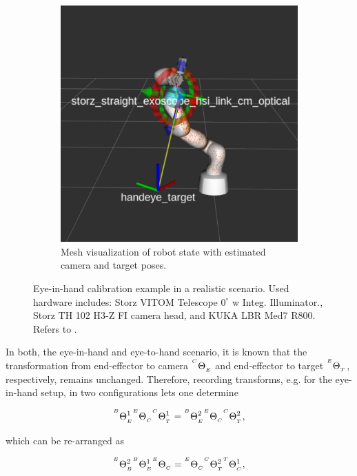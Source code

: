 \begin{figure}[htb]
\begin{subfigure}[b]{0.49\textwidth}
        \includegraphics[width=\textwidth]{introduction/img/aruco_world.png}
        \caption{Mesh visualization of robot state with estimated camera and target poses.}
    \end{subfigure}
    \caption{Eye-in-hand calibration example in a realistic scenario. Used hardware includes: Storz VITOM Telescope $0^\circ$ w Integ. Illuminator., Storz TH 102 H3-Z FI camera head, and KUKA LBR Med7 R800. Refers to .}
    \label{in:fig:eye_in_hand_setup}
\end{figure}
In both, the eye-in-hand and eye-to-hand scenario, it is known that the transformation from end-effector to camera ${}^{^C}\Theta_{_E}$ and end-effector to target ${}^{^E}\Theta_{_T}$, respectively, remains unchanged. Therefore, recording transforms, e.g. for the eye-in-hand setup, in two configurations lets one determine

\begin{equation}
    {}^{^B}\Theta_{_E}^{1}{}^{^E}\Theta_{_C}{}^{^C}\Theta_{_T}^{1} = {}^{^B}\Theta_{_E}^{2}{}^{^E}\Theta_{_C}{}^{^C}\Theta_{_T}^{2},
\end{equation}

which can be re-arranged as

\begin{equation}
    {}^{^E}\Theta_{_B}^{2}{}^{^B}\Theta_{_E}^{1}{}^{^E}\Theta_{_C} = {}^{^E}\Theta_{_C}{}^{^C}\Theta_{_T}^{2}{}^{^T}\Theta_{_C}^{1},
\end{equation}

